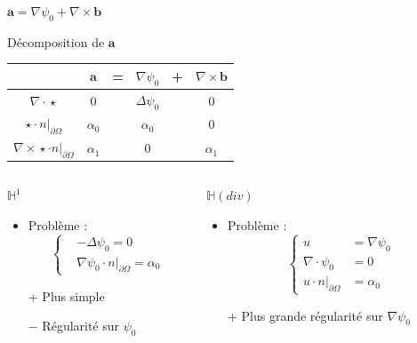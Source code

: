 \documentclass{beamer}
\newcommand{\HH}{{\mathbb{H}}}
\newcommand{\grad}{{\nabla}}
\newcommand{\laplace}{{\Delta}}
\newcommand{\rot}{{\nabla\times}}
\newcommand{\diverg}{{\nabla\cdot}}
\newcommand{\restr}{{\big\rvert_{\partial\Omega}}}
\begin{document}
\begin{frame}{$\mathbf{a}=\grad\psi_0+\rot \mathbf{b}$}
\begin{block}{Décomposition de $\mathbf{a}$}
\begin{center}
\begin{tabular}{c|ccccc}
& $\mathbf{a}$ & = & $\grad\psi_0$ & + & $\rot \mathbf{b}$ \\ \hline
$\diverg\star$ & 0 & & $\laplace\psi_0$ & & 0\\ \hline
$\star\cdot n\restr$ & $\alpha_0$ & & $\alpha_0$ & & 0\\ \hline
$\rot\star\cdot n\restr$ & $\alpha_1$ & & 0 & & $\alpha_1$
\end{tabular}
\end{center}
\end{block}
\begin{columns}[t]
\begin{column}{5cm}
\begin{block}{$\HH^1$}
\begin{itemize}
\item Problème :
\[\left\{
\begin{aligned}
&-\laplace\psi_0 = 0\\
&\grad\psi_0\cdot n\restr=\alpha_0
\end{aligned}
\right.\]
\item[+] Plus simple
\item[$-$] Régularité sur $\psi_0$
\end{itemize}
\end{block}
\end{column}
\begin{column}{5cm}
\begin{block}{$\HH(div)$}
\begin{itemize}
\item Problème :
\[\left\{
\begin{aligned}
u &= \grad \psi_0\\
\diverg\psi_0 &= 0\\
u\cdot n\restr &= \alpha_0
\end{aligned}
\right.\]
\item[+] Plus grande régularité sur $\grad \psi_0$
\end{itemize}
\end{block}
\end{column}
\end{columns}
\end{frame}
\end{document}
